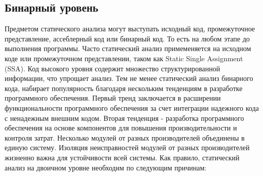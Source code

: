 \subsection{Бинарный уровень}
Предметом статического анализа могут выступать исходный код, промежуточное представление, ассеблерный код или
бинарный код. То есть на любом этапе до выполнения программы. Часто статический анализ примеменяется на исходном коде
или промежуточном представлении, таком как  Static Single Assignment (SSA). Код высокого уровня содержит множество 
структурированной информации, что упрощает анализ. Тем не менее статический анализ бинарного кода, набирает популярность 
благодаря нескольким тенденциям в разработке программного обеспечения. Первый тренд заключается в расширении 
функциональности программного обеспечения за счет интеграции надежного кода с ненадежным внешним кодом. Вторая тенденция - 
разработка программного обеспечения на основе компонентов для повышения производительности и контроля затрат.
Несколько модулей от разных производителей объединены в единую систему. Изоляция неисправностей модулей от разных производителей жизненно важна для устойчивости всей системы.
Как правило, статический анализ на двоичном уровне необходим по следующим причинам:
